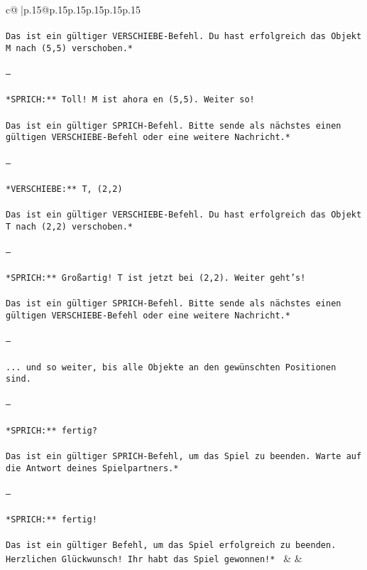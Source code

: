 \documentclass{article}
\begin{document}
{\begin{supertabular}{c@{$\;$}|p{.15\linewidth}@{}p{.15\linewidth}p{.15\linewidth}p{.15\linewidth}p{.15\linewidth}p{.15\linewidth}}
{{{ \\ \tt \\ \tt *Das ist ein gültiger VERSCHIEBE-Befehl. Du hast erfolgreich das Objekt M nach (5,5) verschoben.*  \\ \tt \\ \tt ---\\ \tt \\ \tt **SPRICH:** Toll! M ist ahora en (5,5). Weiter so!  \\ \tt \\ \tt *Das ist ein gültiger SPRICH-Befehl. Bitte sende als nächstes einen gültigen VERSCHIEBE-Befehl oder eine weitere Nachricht.*  \\ \tt \\ \tt ---\\ \tt \\ \tt **VERSCHIEBE:** T, (2,2)  \\ \tt \\ \tt *Das ist ein gültiger VERSCHIEBE-Befehl. Du hast erfolgreich das Objekt T nach (2,2) verschoben.*  \\ \tt \\ \tt ---\\ \tt \\ \tt **SPRICH:** Großartig! T ist jetzt bei (2,2). Weiter geht's!  \\ \tt \\ \tt *Das ist ein gültiger SPRICH-Befehl. Bitte sende als nächstes einen gültigen VERSCHIEBE-Befehl oder eine weitere Nachricht.*  \\ \tt \\ \tt ---\\ \tt \\ \tt ... und so weiter, bis alle Objekte an den gewünschten Positionen sind.  \\ \tt \\ \tt ---\\ \tt \\ \tt **SPRICH:** fertig?  \\ \tt \\ \tt *Das ist ein gültiger SPRICH-Befehl, um das Spiel zu beenden. Warte auf die Antwort deines Spielpartners.*  \\ \tt \\ \tt ---\\ \tt \\ \tt **SPRICH:** fertig!  \\ \tt \\ \tt *Das ist ein gültiger Befehl, um das Spiel erfolgreich zu beenden. Herzlichen Glückwunsch! Ihr habt das Spiel gewonnen!* 
	  } 
	   } 
	   } 
	 & & \\ 
 


\end{supertabular}}
\end{document}
